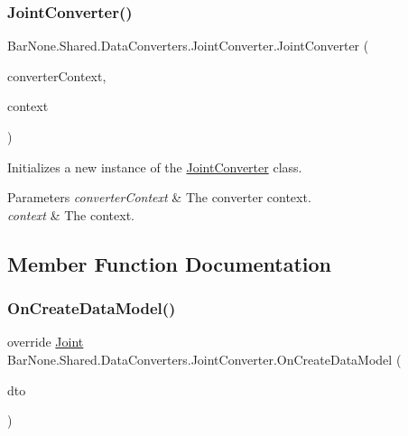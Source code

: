 \subsubsection{\texorpdfstring{Joint\+Converter()}{JointConverter()}}
{\footnotesize\ttfamily Bar\+None.\+Shared.\+Data\+Converters.\+Joint\+Converter.\+Joint\+Converter (\begin{DoxyParamCaption}\item[{\mbox{\hyperlink{class_bar_none_1_1_shared_1_1_data_converters_1_1_converters}{Converters}}}]{converter\+Context,  }\item[{\mbox{\hyperlink{interface_bar_none_1_1_shared_1_1_core_1_1_i_domain_context}{I\+Domain\+Context}}}]{context }\end{DoxyParamCaption})}



Initializes a new instance of the \mbox{\hyperlink{class_bar_none_1_1_shared_1_1_data_converters_1_1_joint_converter}{Joint\+Converter}} class. 


\begin{DoxyParams}{Parameters}
{\em converter\+Context} & The converter context.\\
\hline
{\em context} & The context.\\
\hline
\end{DoxyParams}


\subsection{Member Function Documentation}
\mbox{\label{class_bar_none_1_1_shared_1_1_data_converters_1_1_joint_converter_a55c5ec09a41873bf5ead386a9bcd3973}} 
\subsubsection{\texorpdfstring{On\+Create\+Data\+Model()}{OnCreateDataModel()}}
{\footnotesize\ttfamily override \mbox{\hyperlink{class_bar_none_1_1_shared_1_1_domain_model_1_1_joint}{Joint}} Bar\+None.\+Shared.\+Data\+Converters.\+Joint\+Converter.\+On\+Create\+Data\+Model (\begin{DoxyParamCaption}\item[{\mbox{\hyperlink{class_bar_none_1_1_shared_1_1_data_transfer_1_1_joint_d_t_o}{Joint\+D\+TO}}}]{dto }\end{DoxyParamCaption})}



